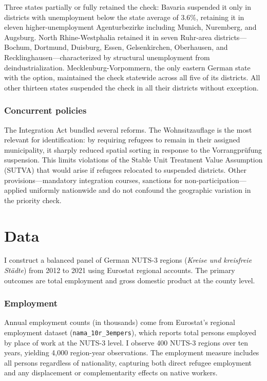 \documentclass[12pt]{article}
\begin{document}
Three states partially or fully retained the check: Bavaria suspended it only in districts with unemployment below the state average of 3.6\%, retaining it in eleven higher-unemployment Agenturbezirke including Munich, Nuremberg, and Augsburg. North Rhine-Westphalia retained it in seven Ruhr-area districts---Bochum, Dortmund, Duisburg, Essen, Gelsenkirchen, Oberhausen, and Recklinghausen---characterized by structural unemployment from deindustrialization. Mecklenburg-Vorpommern, the only eastern German state with the option, maintained the check statewide across all five of its districts. All other thirteen states suspended the check in all their districts without exception.

\subsubsection*{Concurrent policies} The Integration Act bundled several reforms. The Wohnsitzauflage is the most relevant for identification: by requiring refugees to remain in their assigned municipality, it sharply reduced spatial sorting in response to the Vorrangpr\"ufung suspension. This limits violations of the Stable Unit Treatment Value Assumption (SUTVA) that would arise if refugees relocated to suspended districts. Other provisions---mandatory integration courses, sanctions for non-participation---applied uniformly nationwide and do not confound the geographic variation in the priority check.


\section{Data}

I construct a balanced panel of German NUTS-3 regions (\textit{Kreise und kreisfreie St\"adte}) from 2012 to 2021 using Eurostat regional accounts. The primary outcomes are total employment and gross domestic product at the county level.

\subsubsection*{Employment} Annual employment counts (in thousands) come from Eurostat's regional employment dataset (\texttt{nama\_10r\_3empers}), which reports total persons employed by place of work at the NUTS-3 level. I observe 400 NUTS-3 regions over ten years, yielding 4,000 region-year observations. The employment measure includes all persons regardless of nationality, capturing both direct refugee employment and any displacement or complementarity effects on native workers.
\end{document}
